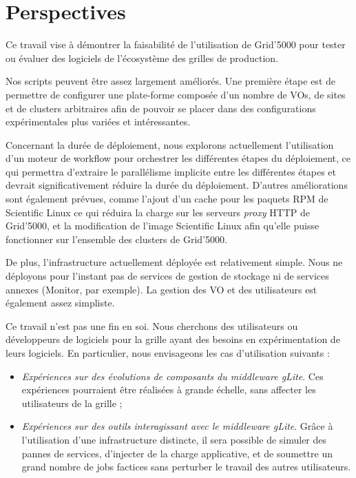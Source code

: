 \documentclass[a4paper,11pt]{article}
\begin{document}
\section{Perspectives}

Ce travail vise à démontrer la faisabilité de l'utilisation de Grid'5000 pour
tester ou évaluer des logiciels de l'écosystème des grilles de production.

Nos scripts peuvent être assez largement améliorés. Une première étape est de
permettre de configurer une plate-forme composée d'un nombre de VOs, de sites
et de clusters arbitraires afin de pouvoir se placer dans des configurations
expérimentales plus variées et intéressantes.

Concernant la durée de déploiement, nous explorons actuellement l'utilisation d'un moteur de workflow
pour orchestrer les différentes étapes du déploiement, ce qui permettra
d'extraire le parallélisme implicite entre les différentes étapes et devrait
significativement réduire la durée du déploie\-ment. D'autres améliorations sont
également prévues, comme l'ajout d'un cache pour les paquets RPM de Scientific
Linux ce qui réduira la charge sur les serveurs \textsl{proxy} HTTP de
Grid'5000, et la modification de l'image Scientific Linux afin qu'elle puisse
fonctionner sur l'ensemble des clusters de Grid'5000.

De plus, l'infrastructure actuellement déployée est relativement simple. Nous
ne déployons pour l'instant pas de services de gestion de stockage ni de
services annexes (Monitor, par exemple). La gestion des VO et des utilisateurs
est également assez simpliste.

Ce travail n'est pas une fin en soi. Nous cherchons des utilisateurs ou
développeurs de logiciels pour la grille ayant des besoins en expérimentation
de leurs logiciels. En particulier, nous envisageons les cas d'utilisation
suivants :

\begin{itemize}

\item \textit{Expériences sur des évolutions de composants du middleware
	gLite}. Ces expériences pourraient être réalisées à grande échelle,
	sans affecter les utilisateurs de la grille ;

\item \textit{Expériences sur des outils interagissant avec le middleware
	gLite}. Grâce à l'utilisation d'une infrastructure distincte, il sera
	possible de simuler des pannes de services, d'injecter de la charge
	applicative, et de soumettre un grand nombre de jobs factices sans
	perturber le travail des autres utilisateurs.

\end{itemize}
\end{document}
